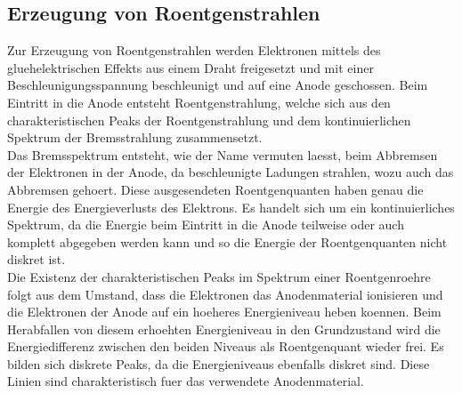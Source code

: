 \newpage \subsection{Erzeugung von Roentgenstrahlen}
Zur Erzeugung von Roentgenstrahlen werden Elektronen mittels des gluehelektrischen Effekts aus einem Draht freigesetzt und mit einer Beschleunigungsspannung beschleunigt und auf eine Anode geschossen. Beim Eintritt in die Anode entsteht Roentgenstrahlung, welche sich aus den charakteristischen Peaks der Roentgenstrahlung und dem kontinuierlichen Spektrum der Bremsstrahlung zusammensetzt.\\
Das Bremsspektrum entsteht, wie der Name vermuten laesst, beim Abbremsen der Elektronen in der Anode, da beschleunigte Ladungen strahlen, wozu auch das Abbremsen gehoert. Diese ausgesendeten Roentgenquanten haben genau die Energie des Energieverlusts des Elektrons. Es handelt sich um ein kontinuierliches Spektrum, da die Energie beim Eintritt in die Anode teilweise oder auch komplett abgegeben werden kann und so die Energie der Roentgenquanten nicht diskret ist.\\
Die Existenz der charakteristischen Peaks im Spektrum einer Roentgenroehre folgt aus dem Umstand, dass die Elektronen das Anodenmaterial ionisieren und die Elektronen der Anode auf ein hoeheres Energieniveau heben koennen. Beim Herabfallen von diesem erhoehten Energieniveau in den Grundzustand wird die Energiedifferenz zwischen den beiden Niveaus als Roentgenquant wieder frei. Es bilden sich diskrete Peaks, da die Energieniveaus ebenfalls diskret sind. Diese Linien sind charakteristisch fuer das verwendete Anodenmaterial.
